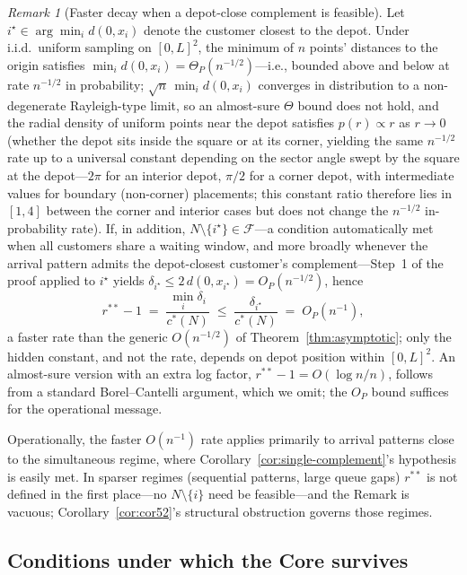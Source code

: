 \documentclass[11pt]{article}
\theoremstyle{plain}
\theoremstyle{definition}
\theoremstyle{remark}
\newtheorem{remark}[theorem]{Remark}
\newcommand{\F}{\mathcal{F}}
\newcommand{\cstar}{c^{\ast}}
\begin{document}
\begin{remark}[Faster decay when a depot-close complement is feasible]
\label{rem:asymptotic-tighter}
Let $i^{\star}\in\arg\min_i d(0,x_i)$ denote the customer closest to the depot. Under i.i.d.\ uniform sampling on $[0,L]^2$, the minimum of $n$ points' distances to the origin satisfies $\min_i d(0,x_i) = \Theta_P(n^{-1/2})$---i.e., bounded above and below at rate $n^{-1/2}$ in probability; $\sqrt{n}\,\min_i d(0,x_i)$ converges in distribution to a non-degenerate Rayleigh-type limit, so an almost-sure $\Theta$ bound does not hold, and the radial density of uniform points near the depot satisfies $p(r)\propto r$ as $r\to 0$ (whether the depot sits inside the square or at its corner, yielding the same $n^{-1/2}$ rate up to a universal constant depending on the sector angle swept by the square at the depot---$2\pi$ for an interior depot, $\pi/2$ for a corner depot, with intermediate values for boundary (non-corner) placements; this constant ratio therefore lies in $[1,4]$ between the corner and interior cases but does not change the $n^{-1/2}$ in-probability rate). If, in addition, $N\setminus\{i^{\star}\}\in\F$---a condition automatically met when all customers share a waiting window, and more broadly whenever the arrival pattern admits the depot-closest customer's complement---Step~1 of the proof applied to $i^{\star}$ yields $\delta_{i^{\star}} \le 2\,d(0,x_{i^{\star}}) = O_P(n^{-1/2})$, hence
\[
r^{\ast\ast}-1 \;=\; \frac{\min_i \delta_i}{\cstar(N)} \;\le\; \frac{\delta_{i^{\star}}}{\cstar(N)} \;=\; O_P(n^{-1}),
\]
a faster rate than the generic $O(n^{-1/2})$ of Theorem~\ref{thm:asymptotic}; only the hidden constant, and not the rate, depends on depot position within $[0,L]^2$. An almost-sure version with an extra log factor, $r^{\ast\ast}-1 = O(\log n / n)$, follows from a standard Borel--Cantelli argument, which we omit; the $O_P$ bound suffices for the operational message.

Operationally, the faster $O(n^{-1})$ rate applies primarily to arrival patterns close to the simultaneous regime, where Corollary~\ref{cor:single-complement}'s hypothesis is easily met. In sparser regimes (sequential patterns, large queue gaps) $r^{\ast\ast}$ is not defined in the first place---no $N\setminus\{i\}$ need be feasible---and the Remark is vacuous; Corollary~\ref{cor:cor52}'s structural obstruction governs those regimes.
\end{remark}

\subsection{Conditions under which the Core survives}
\label{ssec:survive}
\end{document}
